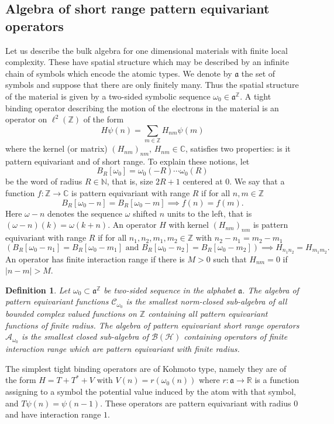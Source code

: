 \documentclass[11pt]{amsart}
\newtheorem{definition}{Definition}[section]
\newcommand{\R}{\mathbb{R}}
\newcommand{\Z}{\mathbb{Z}}
\newcommand{\N}{\mathbb{N}}
\newcommand{\C}{\mathbb{C}}
\begin{document}
\subsection{Algebra of short range pattern equivariant operators}
Let us describe the bulk algebra for one dimensional materials with finite local complexity. These have spatial structure which may be described by an infinite chain of symbols which encode the atomic types. We denote by $\mathfrak a$ the set of symbols 
and suppose that there are only finitely many. Thus the spatial structure of the material is given by a two-sided symbolic sequence 
$\omega_0\in \mathfrak a^{\Z}$. A tight binding operator describing the motion of the electrons in the material is an operator on  $\ell^2(\Z)$ of the form 
$$H\psi(n)=\sum_{m\in\Z} H_{nm}\psi(m)$$
where the kernel (or matrix) $(H_{nm})_{nm}$, $H_{nm}\in\C$, satisfies two properties: is it pattern equivariant and of short range. To explain these notions, let 
$$B_R\left[\omega_0\right]=\omega_0(-R) \cdots \omega_0(R) $$
be the word of radius $R\in\N$, that is, size $2R+1$ centered at $0$. We say that a function $f : \Z \rightarrow \C$ is pattern equivariant with range $R$ if for all $n,m \in \Z$
$$B_R [\omega_0 -n] = B_R [\omega_0 -m] \implies f (n) = f (m).$$
Here $\omega-n$ denotes the sequence $\omega$ shifted $n$ units to the left, that is $(\omega-n)(k) = \omega(k+n)$.
An operator $H$ with kernel $(H_{nm})_{nm}$ is pattern equivariant with range $R$ if for all $n_1, n_2, m_1, m_2 \in \Z$ with $n_2 - n_1 = m_2 - m_1$
$$\left(B_R [\omega_0 - n_1] = B_R [\omega_0 - m_1] \text{ and } B_R [\omega_0 - n_2] = B_R [\omega_0 - m_2] \right) \implies H_{n_1 n_2} = H_{m_1 m_2} .$$
An operator has finite interaction range if there is $M>0$ such that $H _{nm}=0$ if $|n-m|>M$. 



\newcommand{\CPE}{\mathcal{C}_{\omega_0}}
\begin{definition} Let $\omega_0\subset\mathfrak a^\Z$ be two-sided sequence in the alphabet $\mathfrak a$. 
	The algebra of pattern equivariant functions 
	$\CPE$ is the smallest norm-closed sub-algebra of all bounded complex valued functions on $\Z$ containing
	all pattern equivariant functions of finite radius.  
	The algebra of pattern equivariant short range operators $\mathcal{A}_{\omega_0}$ is the smallest closed sub-algebra of $\mathcal{B}(\mathcal{H})$ containing operators of finite interaction range which are pattern equivariant with finite radius. 
\end{definition}
The simplest tight binding operators are of Kohmoto type, namely they are of the form $H = T+T^*+V$ with $V(n) = r(\omega_0(n))$ where $r:\mathfrak a \to \R$ is a function assigning to a symbol the potential value induced by the atom with that symbol, and $T\psi(n) = \psi(n-1)$. These operators 
are pattern equivariant with radius $0$ and have interaction range $1$. 
\end{document}
